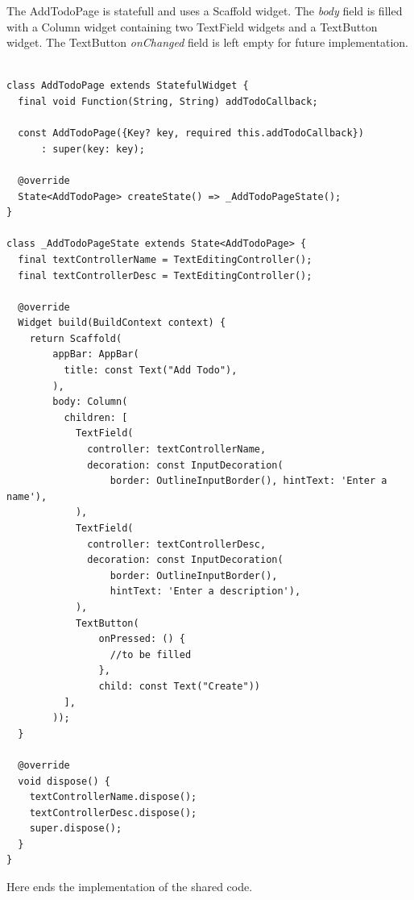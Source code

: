 The AddTodoPage is statefull and uses a Scaffold widget. The \textit{body} field is filled with a Column widget containing two TextField widgets and a TextButton widget. The TextButton \textit{onChanged }field is left empty for future implementation.
	\mbox{}
	\begin{code}
	 \mbox{}
			\label{code:2.14}
	\begin{verbatim}

class AddTodoPage extends StatefulWidget {
  final void Function(String, String) addTodoCallback;

  const AddTodoPage({Key? key, required this.addTodoCallback})
      : super(key: key);

  @override
  State<AddTodoPage> createState() => _AddTodoPageState();
}

class _AddTodoPageState extends State<AddTodoPage> {
  final textControllerName = TextEditingController();
  final textControllerDesc = TextEditingController();

  @override
  Widget build(BuildContext context) {
    return Scaffold(
        appBar: AppBar(
          title: const Text("Add Todo"),
        ),
        body: Column(
          children: [
            TextField(
              controller: textControllerName,
              decoration: const InputDecoration(
                  border: OutlineInputBorder(), hintText: 'Enter a name'),
            ),
            TextField(
              controller: textControllerDesc,
              decoration: const InputDecoration(
                  border: OutlineInputBorder(),
                  hintText: 'Enter a description'),
            ),
            TextButton(
                onPressed: () {
                  //to be filled
                },
                child: const Text("Create"))
          ],
        ));
  }

  @override
  void dispose() {
    textControllerName.dispose();
    textControllerDesc.dispose();
    super.dispose();
  }
}

	\end{verbatim}
	\end{code}
Here ends the implementation of the shared code.